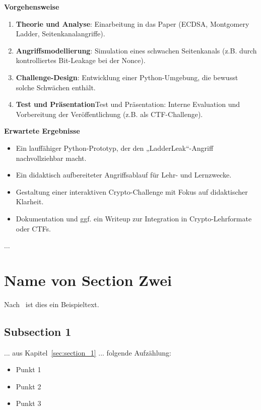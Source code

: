 \documentclass{article}
\begin{document}
\textbf{Vorgehensweise}
\begin{enumerate}
    \item \textbf{Theorie und Analyse}: Einarbeitung in das Paper (ECDSA, Montgomery Ladder, Seitenkanalangriffe).
    \item \textbf{Angriffsmodellierung}: Simulation eines schwachen Seitenkanals (z.B. durch kontrolliertes Bit-Leakage bei der Nonce).
    \item \textbf{Challenge-Design}: Entwicklung einer Python-Umgebung, die bewusst solche Schwächen enthält.
    \item \textbf{Test und Präsentation}Test und Präsentation: Interne Evaluation und Vorbereitung der Veröffentlichung (z.B. als CTF-Challenge).
\end{enumerate}

\textbf{Erwartete Ergebnisse}
\begin{itemize}
    \item Ein lauffähiger Python-Prototyp, der den „LadderLeak“-Angriff nachvollziehbar macht.
    \item Ein didaktisch aufbereiteter Angriffsablauf für Lehr- und Lernzwecke.
    \item Gestaltung einer interaktiven Crypto-Challenge mit Fokus auf didaktischer Klarheit.
    \item Dokumentation und ggf. ein Writeup zur Integration in Crypto-Lehrformate oder CTFs.
\end{itemize}


\label{sec:section_1}

$\ldots$

\section{Name von Section Zwei}
\label{sec:section_2}

Nach~\cite{example_ref} ist dies ein Beispieltext.


\subsection{Subsection 1}
\label{subsec:label_fuer_referenz_unterkapitel}

... aus Kapitel~\ref{sec:section_1} ... folgende Aufzählung:

\begin{itemize}
\setlength{\itemsep}{0pt}
    \item Punkt 1
    \item Punkt 2
    \item Punkt 3
\end{itemize}
\end{document}
